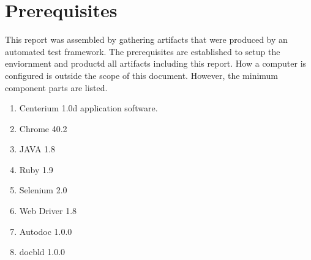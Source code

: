 \section{Prerequisites}
This report was assembled by gathering artifacts that were produced by an
automated test framework.  The prerequisites are established to setup the
enviornment and productd all artifacts including this report.  How a computer is
configured is outside the scope of this document.  However, the minimum component parts are listed.

\begin{enumerate}

\item Centerium 1.0d application software.
\item Chrome 40.2
\item JAVA 1.8
\item Ruby 1.9
\item Selenium 2.0
\item Web Driver 1.8
\item Autodoc 1.0.0
\item docbld 1.0.0

\end{enumerate}
